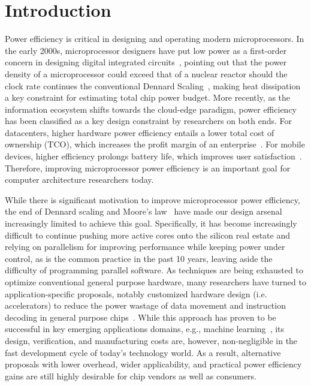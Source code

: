 
\chapter{Introduction}
\label{sec:intro}

Power efficiency is critical in designing and operating modern microprocessors. In the early 2000s, microprocessor designers have put low power as a first-order concern in designing digital integrated circuits~\cite{pedram2002power, rabaey2009low}, pointing out that the power density of a microprocessor could exceed that of a nuclear reactor should the clock rate continues the conventional Dennard Scaling~\cite{rabaey2002digital}, making heat dissipation a key constraint for estimating total chip power budget. More recently, as the information ecosystem shifts towards the cloud-edge paradigm, power efficiency has been classified as a key design constraint by researchers on both ends. For datacenters, higher hardware power efficiency entails a lower total cost of ownership (TCO), which increases the profit margin of an enterprise~\cite{barroso2013datacenter}. For mobile devices, higher efficiency prolongs battery life, which improves user satisfaction~\cite{zhu2017energy}. Therefore, improving microprocessor power efficiency is an important goal for computer architecture researchers today.

While there is significant motivation to improve microprocessor power efficiency, the end of Dennard scaling and Moore's law~\cite{esmaeilzadeh2011dark,theis2017end} have made our design arsenal increasingly limited to achieve this goal. Specifically, it has become increasingly difficult to continue pushing more active cores onto the silicon real estate and relying on parallelism for improving performance while keeping power under control, as is the common practice in the past 10 years, leaving aside the difficulty of programming parallel software. As techniques are being exhausted to optimize conventional general purpose hardware, many researchers have turned to application-specific proposals, notably customized hardware design (i.e. accelerators) to reduce the power wastage of data movement and instruction decoding in general purpose chips~\cite{qadeer2015convolution}. While this approach has proven to be successful in key emerging applications domains, e.g., machine learning~\cite{chen2014diannao, jouppi2017datacenter, caulfield2016cloud, dean2018new}, its design, verification, and manufacturing costs are, however, non-negligible in the fast development cycle of today's technology world. As a result, alternative proposals with lower overhead, wider applicability, and practical power efficiency gains are still highly desirable for chip vendors as well as consumers.

